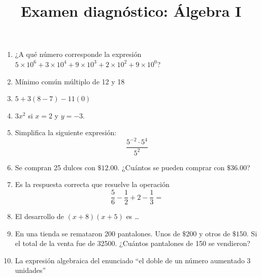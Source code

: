 \documentclass{article}
\title{Examen diagnóstico: Álgebra I}
\begin{document}
\maketitle
\begin{enumerate}
    \item ¿A qué número corresponde la expresión \(5\times 10^6 + 3\times 10^4 + 9\times 10^3 + 2\times 10^2 + 9\times 10^0\)?
    \item Mínimo común múltiplo de 12 y 18
    \item \(5 + 3(8 - 7) - 11(0)\)
    \item \(3x^2\) si \(x = 2\) y \(y = -3\).
    \item Simplifica la siguiente expresión: \[\frac{5^{-2}\cdot5^4}{5^2}\]
    \item Se compran 25 dulces con \(\mathdollar 12.00\). ¿Cuántos se pueden comprar con \(\mathdollar 36.00\)?
    \item Es la respuesta correcta que resuelve la operación \[\frac{5}{6} - \frac{1}{2} + 2 - \frac{1}{3} = \]
    \item El desarrollo de \((x + 8)(x + 5)\) es \dots
    \item En una tienda se remataron 200 pantalones. Unos de \(\mathdollar 200\) y otros de \(\mathdollar 150\). Si el total de la venta fue de 32500. ¿Cuántos pantalones de 150 se vendieron?
    \item La expresión algebraica del enunciado ``el doble de un número aumentado 3 unidades''
\end{enumerate}
\end{document}
